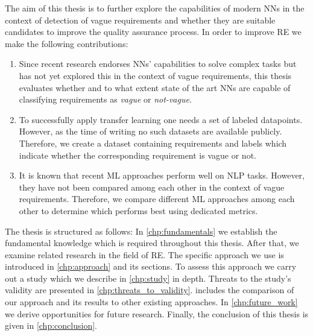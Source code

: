 The aim of this thesis is to further explore the capabilities of modern \acp{NN} in the context of detection of vague requirements and whether they are suitable candidates to improve the quality assurance process.
In order to improve \ac{RE} we make the following contributions:
\begin{enumerate}
    \item Since recent research endorses \acp{NN}' capabilities to solve complex tasks but has not yet explored this in the context of vague requirements, this thesis evaluates whether and to what extent state of the art \acp{NN} are capable of classifying requirements as \textit{vague} or \textit{not-vague}.
    \item To successfully apply transfer learning one needs a set of labeled datapoints. However, as the time of writing no such datasets are available publicly.
        Therefore, we create a dataset containing requirements and labels which indicate whether the corresponding requirement is vague or not.
    \item It is known that recent \ac{ML} approaches perform well on \ac{NLP} tasks.
        However, they have not been compared among each other in the context of vague requirements.
        Therefore, we compare different \ac{ML} approaches among each other to determine which performs best using dedicated metrics.
\end{enumerate}

The thesis is structured as follows:
In \cref{chp:fundamentals} we establish the fundamental knowledge which is required throughout this thesis.
After that, we examine related research in the field of \ac{RE}.
The specific approach we use is introduced in \cref{chp:approach} and its sections.
To assess this approach we carry out a study which we describe in \cref{chp:study} in depth.
Threats to the study's validity are presented in \cref{chp:threats_to_validity}.
 includes the comparison of our approach and its results to other existing approaches.
In \cref{chp:future_work} we derive opportunities for future research.
Finally, the conclusion of this thesis is given in \cref{chp:conclusion}.
